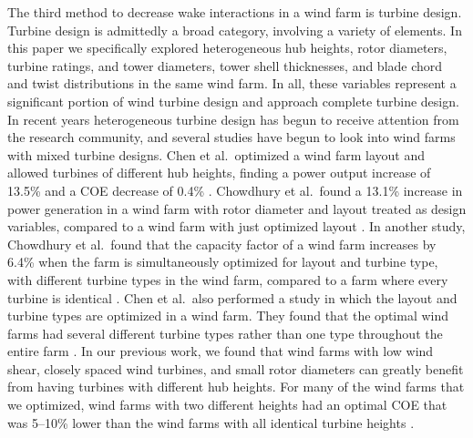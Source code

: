 \documentclass[WESD, manuscript]{copernicus}
\providecommand{\DIFadd}[1]{{\protect\color{blue}\uwave{#1}}} %
\providecommand{\DIFaddbegin}{} %
\providecommand{\DIFaddend}{} %
\begin{document}
The third method to decrease wake interactions in a wind farm is turbine design. Turbine design is admittedly a broad category, involving a variety of elements. In this paper we specifically explored heterogeneous hub heights, rotor diameters, turbine ratings, and tower diameters, tower shell thicknesses, and blade chord and twist distributions in the same wind farm. In all, these variables represent a significant portion of wind turbine design and approach complete turbine design. 
In recent years heterogeneous turbine design has begun to receive attention from the research community, and several studies have begun to look into wind farms with mixed turbine designs. Chen et al.~optimized
a wind farm layout and allowed turbines of different hub heights, finding a power output increase of 13.5\% and a COE decrease of 0.4\% \DIFaddbegin \DIFadd{compared to a uniform hub height farm }\DIFaddend \citep{chen2013wind}. Chowdhury et al.~found
a 13.1\% increase in power generation in a wind farm with rotor diameter and layout treated as design variables, compared to a wind farm with just optimized layout \citep{chowdhury2010optimizing}. In another study, Chowdhury et al.~found that the capacity factor of a wind farm increases by 6.4\% when the farm is simultaneously optimized for layout and turbine type, with different turbine types in the wind farm, compared to a farm where every turbine is identical \citep{chowdhury2013optimizing}. Chen et al.~also performed a study in which the layout and turbine types are optimized in a wind farm. They found that the optimal wind farms had several different turbine types rather than one type throughout the entire farm \citep{chen2015multi}. In our previous work, we found that wind farms with \DIFaddbegin \DIFadd{constant }\DIFaddend low wind shear, closely spaced wind turbines, and small rotor diameters can greatly benefit from having turbines with different hub heights. For many of the wind farms that we optimized, wind farms with two different heights had an optimal COE that was 5--10\% lower than the wind farms with all identical turbine heights \citep{stanley2018}.
\end{document}
